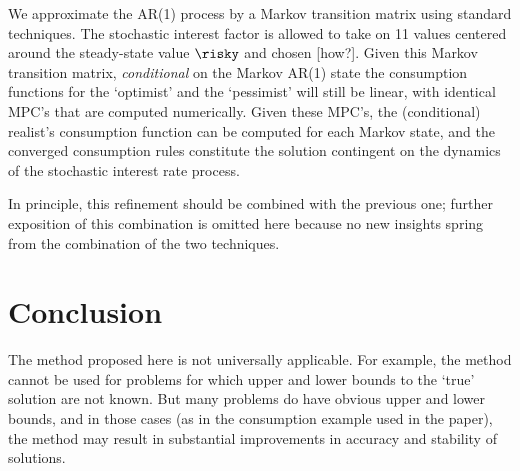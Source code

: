 \documentclass[titlepage, headings=optiontotocandhead]{econark}
\newcommand{\texname}{cctwMoM} %
\begin{document}
{We approximate the AR(1) process by a Markov transition matrix using standard techniques.  The stochastic interest factor is allowed to take
on 11 values centered around the steady-state value $\risky$ and chosen [how?].  Given this Markov transition matrix,
{\it conditional} on the Markov AR(1) state the consumption functions for the `optimist' and the `pessimist' will still be linear,
with identical MPC's that are computed numerically.  Given these MPC's, the (conditional) realist's consumption function can be computed for each Markov state, and the converged consumption rules constitute the solution contingent on the dynamics of the stochastic
interest rate process.

In principle, this refinement should be combined with the previous one;
further exposition of this combination is omitted here because no new
insights spring from the combination of the two techniques.



}{}

\hypertarget{conclusion}{}
\section{Conclusion}

The method proposed here is not universally applicable.
For example, the method cannot be used for problems for which upper and lower bounds to the `true' solution are not known.
But many problems do have obvious upper and lower bounds, and in those cases (as in the consumption example used in the paper), the method may result in substantial improvements in accuracy and stability of solutions.

\vfill\clearpage
\econarkmultibib{\texname} 
\end{document}
